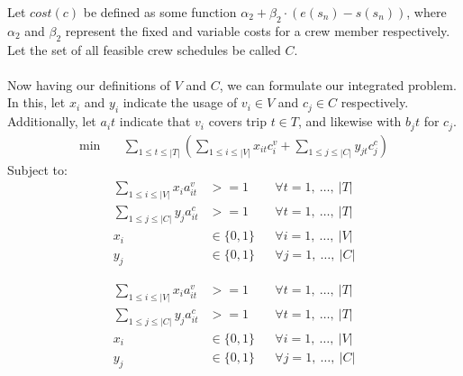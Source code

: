 \documentclass[]{article}
\begin{document}
Let $cost(c)$ be defined as some function $\alpha_2 + \beta_2 \cdot (e(s_n) - s(s_n))$, where $\alpha_2$ and $\beta_2$ represent the fixed and variable costs for a crew member respectively. Let the set of all feasible crew schedules be called $C$. \\\\
Now having our definitions of $V$ and $C$, we can formulate our integrated problem. In this, let $x_i$ and $y_i$ indicate the usage of $v_i \in V$ and $c_j \in C$ respectively. Additionally, let $a_it$ indicate that $v_i$ covers trip $t \in T$, and likewise with $b_jt$ for $c_j$.
\begin{align}
\min \quad
& \sum_{1 \leq t \leq |T|} (\sum_{1 \leq i \leq |V|} x_{it}c^v_i + \sum_{1 \leq j \leq |C|} y_{jt}c^c_j)  
\end{align}
Subject to:
\begin{align}
\sum_{1 \leq i \leq |V|} x_{i}a^v_{it} &>= 1 && \forall t = 1,\:\dots,\:|T| \\
\sum_{1 \leq j \leq |C|} y_{j}a^c_{it} &>= 1 && \forall t = 1,\:\dots,\:|T| \\
x_{i} &\in \{ 0, 1 \} && \forall i = 1,\:\dots,\:|V| \\
y_{j} &\in \{ 0, 1 \} && \forall j = 1,\:\dots,\:|C|
\end{align}


\begin{align}
\sum_{1 \leq i \leq |V|} x_{i}a^v_{it} &>= 1 && \forall t = 1,\:\dots,\:|T| \\
\sum_{1 \leq j \leq |C|} y_{j}a^c_{it} &>= 1 && \forall t = 1,\:\dots,\:|T| \\
x_{i} &\in \{ 0, 1 \} && \forall i = 1,\:\dots,\:|V| \\
y_{j} &\in \{ 0, 1 \} && \forall j = 1,\:\dots,\:|C|
\end{align}
\end{document}
